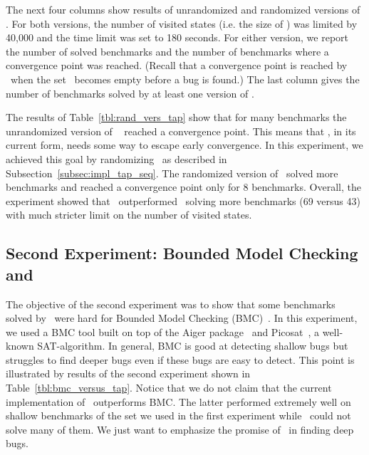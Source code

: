The next four columns show results of unrandomized and randomized versions of \TS.   For both versions,
the number of visited states (i.e. the size of \All) was limited by 40,000 and the time limit was set to 180 seconds.
For either version, we report the number of solved benchmarks and the number of benchmarks where a convergence point
was reached. (Recall that a convergence point is reached by \TS~when the set \Acts~becomes empty before a bug is found.)
 The last column gives the number of benchmarks
solved by at least one version of \TS.


The results of Table~\ref{tbl:rand_vers_tap} show that for many benchmarks the unrandomized version of \TS~  
reached a convergence point. This means that 
\TS, in its current form, needs some way to escape early convergence. In this experiment, we achieved this goal
by randomizing \TS~as described in Subsection~\ref{subsec:impl_tap_seq}. The randomized version
of \TS~solved more benchmarks and reached a convergence point only for 8 benchmarks. 
Overall,  the experiment showed that \TS~outperformed \Rnd~solving more benchmarks (69 versus 43) with much stricter limit on
the number of visited states. 

\subsection{Second Experiment: Bounded Model Checking and \TS}
\label{subsec:second_exper}
The objective of the second experiment was to show that some benchmarks solved by \TS~were 
hard for  Bounded Model Checking (BMC)~\cite{bmc}. 
In this experiment, we used a BMC tool built on top  of  the Aiger package~\cite{aiger} and Picosat~\cite{picosat}, a well-known SAT-algorithm.
In general, BMC is good at detecting shallow bugs but struggles to find deeper bugs even if these bugs are easy to detect.
This point is illustrated by results of the second experiment shown in Table~\ref{tbl:bmc_versus_tap}.  Notice that we do not claim
that the current implementation of \TS~outperforms BMC. The latter performed extremely well on shallow benchmarks
of the set we used in the first experiment  while \TS~could not solve many of them. We just
want to emphasize the promise of \TS~in finding deep bugs.

